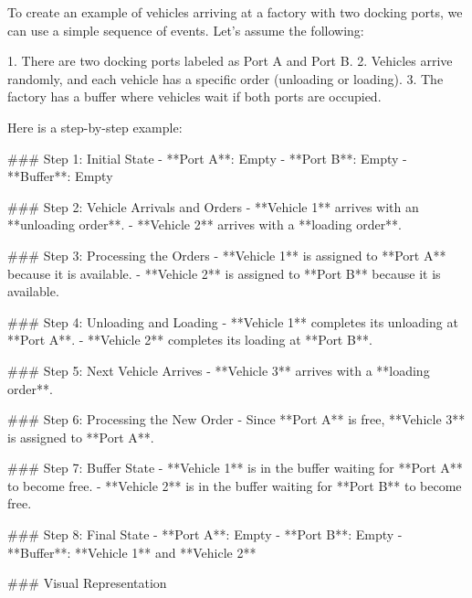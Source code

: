 To create an example of vehicles arriving at a factory with two docking ports, we can use a simple sequence of events. Let's assume the following:

1. There are two docking ports labeled as Port A and Port B.
2. Vehicles arrive randomly, and each vehicle has a specific order (unloading or loading).
3. The factory has a buffer where vehicles wait if both ports are occupied.

Here is a step-by-step example:

### Step 1: Initial State
- **Port A**: Empty
- **Port B**: Empty
- **Buffer**: Empty

### Step 2: Vehicle Arrivals and Orders
- **Vehicle 1** arrives with an **unloading order**.
- **Vehicle 2** arrives with a **loading order**.

### Step 3: Processing the Orders
- **Vehicle 1** is assigned to **Port A** because it is available.
- **Vehicle 2** is assigned to **Port B** because it is available.

### Step 4: Unloading and Loading
- **Vehicle 1** completes its unloading at **Port A**.
- **Vehicle 2** completes its loading at **Port B**.

### Step 5: Next Vehicle Arrives
- **Vehicle 3** arrives with a **loading order**.

### Step 6: Processing the New Order
- Since **Port A** is free, **Vehicle 3** is assigned to **Port A**.

### Step 7: Buffer State
- **Vehicle 1** is in the buffer waiting for **Port A** to become free.
- **Vehicle 2** is in the buffer waiting for **Port B** to become free.

### Step 8: Final State
- **Port A**: Empty
- **Port B**: Empty
- **Buffer**: **Vehicle 1** and **Vehicle 2**

### Visual Representation

